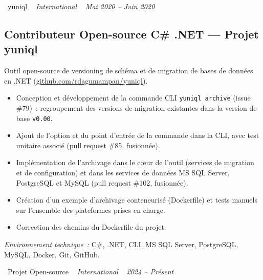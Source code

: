 \documentclass[10pt,a4paper]{article}
\begin{document}
\vspace{10pt}

\noindent\textcolor{primary}{ \faBuilding\ yuniql} \quad
\textit{ \small \textcolor{darkgray}{ \faMapMarker\ } International } \hfill
\textit{ \small \textcolor{darkgray}{ \faCalendar\ } Mai 2020 -- Juin 2020 }

\vspace{4pt}

\subsection*{Contributeur Open-source C\# .NET --- Projet yuniql}
\color{darkgray}
Outil open-source de versioning de schéma et de migration de bases de données en .NET (\href{https://github.com/rdagumampan/yuniql}{github.com/rdagumampan/yuniql}).
\begin{itemize}
  \item Conception et développement de la commande CLI \texttt{yuniql archive} (issue \#79)~: regroupement des versions de migration existantes dans la version de base \texttt{v0.00}.
  \item Ajout de l'option et du point d'entrée de la commande dans la CLI, avec test unitaire associé (pull request \#85, fusionnée).
  \item Implémentation de l'archivage dans le cœur de l'outil (services de migration et de configuration) et dans les services de données MS SQL Server, PostgreSQL et MySQL (pull request \#102, fusionnée).
  \item Création d'un exemple d'archivage conteneurisé (Dockerfile) et tests manuels sur l'ensemble des plateformes prises en charge.
  \item Correction des chemins du Dockerfile du projet.
\end{itemize}
\textit{Environnement technique~:} C\#, .NET, CLI, MS SQL Server, PostgreSQL, MySQL, Docker, Git, GitHub.

\vspace{10pt}

\noindent\textcolor{primary}{ \faBuilding\ Projet Open-source} \quad
\textit{ \small \textcolor{darkgray}{ \faMapMarker\ } International } \hfill
\textit{ \small \textcolor{darkgray}{ \faCalendar\ } 2024 -- Présent }

\vspace{4pt}
\end{document}
